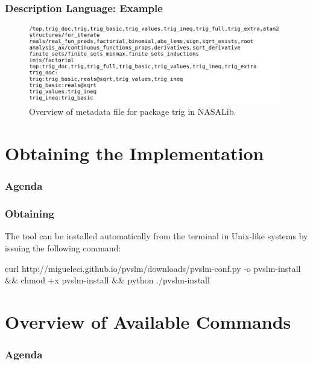 \documentclass[mathserif,fleqn]{beamer}
\begin{document}
\begin{frame}
  \frametitle{Description Language: Example}
  \begin{figure}
   \centering
   \includegraphics[width=11cm]{top.png}
   \caption{Overview of metadata file for package trig in NASALib.}
  \end{figure}

\end{frame}

\section{Obtaining the  Implementation}

\begin{frame}
  \frametitle{Agenda} 
  \tableofcontents[currentsection]
\end{frame}

\begin{frame}
   \frametitle{Obtaining }

   The  tool can be installed automatically from the
   terminal in Unix-like systems by issuing the following command:
   
   \bigskip
   
   \begin{small}
   \begin{tt}
     curl http://migueleci.github.io/pvslm/downloads/pvslm-conf.py 
      -o pvslm-install $\&\&$ chmod +x pvslm-install $\&\&$ 
      python ./pvslm-install
   \end{tt}
   \end{small}

\end{frame}

\section{Overview of Available Commands}

\begin{frame}
  \frametitle{Agenda} 
  \tableofcontents[currentsection]
\end{frame}
\end{document}

